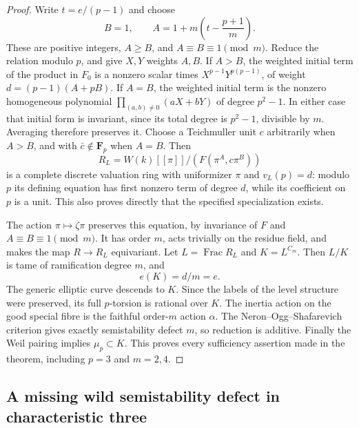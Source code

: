 \begin{proof}
Write $t=e/(p-1)$ and choose
\[
 B=1,\qquad A=1+m\left(t-\frac{p+1}{m}\right).
\]
These are positive integers, $A\geq B$, and $A\equiv B\equiv1\pmod m$.
Reduce the relation modulo $p$, and give $X,Y$ weights $A,B$. If $A>B$, the weighted initial term of the
product in $F_0$ is a nonzero scalar times
$X^{p-1}Y^{p(p-1)}$, of weight
$d=(p-1)(A+pB)$. If $A=B$, the weighted initial term is the nonzero
homogeneous polynomial $\prod_{(a,b)\ne0}(aX+bY)$ of degree $p^2-1$.
In either case that initial form is invariant, since its total degree
is $p^2-1$, divisible by $m$. Averaging therefore preserves it.
Choose a Teichmuller unit $c$ arbitrarily when $A>B$, and with
$\bar c\notin\mathbf F_p$ when $A=B$. Then
\[
 R_L=W(k)[[\pi]]/(F(\pi^A,c\pi^B))
\]
is a complete discrete valuation ring with uniformizer $\pi$ and
$v_L(p)=d$: modulo $p$ its defining equation has first nonzero term
of degree $d$, while its coefficient on $p$ is a unit. This also
proves directly that the specified specialization exists.

The action $\pi\mapsto\zeta\pi$ preserves this equation, by invariance
of $F$ and $A\equiv B\equiv1\pmod m$. It has order $m$, acts trivially
on the residue field, and makes the map $R\to R_L$ equivariant.
Let $L=\operatorname{Frac}R_L$ and $K=L^{C_m}$. Then $L/K$ is tame
of ramification degree $m$, and
\[
 e(K)=d/m=e.
\]
The generic elliptic curve descends to $K$. Since the labels of the
level structure were preserved, its full $p$-torsion is rational over
$K$. The inertia action on the good special fibre is the faithful
order-$m$ action $\alpha$. The Neron--Ogg--Shafarevich criterion gives
exactly semistability defect $m$, so reduction is additive. Finally the
Weil pairing implies $\mu_p\subset K$. This proves every sufficiency
assertion made in the theorem, including $p=3$ and $m=2,4$.
\end{proof}

\subsection{A missing wild semistability defect in characteristic three}

